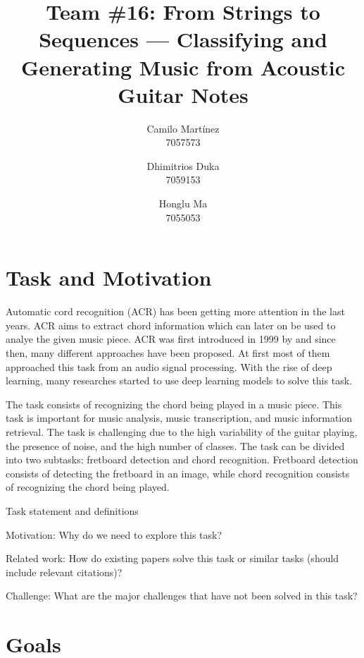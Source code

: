 \documentclass[10pt,twocolumn,letterpaper]{article}
\begin{document}
\title{Team \#16: From Strings to Sequences --- Classifying and Generating Music from Acoustic Guitar Notes}

\author{
Camilo Martínez\\
7057573\\
\and
Dhimitrios Duka\\
7059153\\
\and
Honglu Ma\\
7055053\\
}
\maketitle

\section{Task and Motivation}
Automatic cord recognition (ACR) has been getting more attention in the last years. ACR aims to extract chord information which can later on be used to analye the given music piece. ACR was first introduced in 1999 by \cite{} and since then, many different approaches have been proposed. At first most of them \cite{} approached this task from an audio signal processing. With the rise of deep learning, many researches started to use deep learning models to solve this task.  


The task consists of recognizing the chord being played in a music piece. This task is important for music analysis, music transcription, and music information retrieval. The task is challenging due to the high variability of the guitar playing, the presence of noise, and the high number of classes. The task can be divided into two subtasks: fretboard detection and chord recognition. Fretboard detection consists of detecting the fretboard in an image, while chord recognition consists of recognizing the chord being played.

Task statement and definitions

Motivation: Why do we need to explore this task?

Related work: How do existing papers solve this task or similar tasks (should include relevant citations)?

Challenge: What are the major challenges that have not been solved in this task?

\cite{Kristian_Zaman_Tenoyo_Jodhinata_2024}
\cite{du2023conditional}

\section{Goals}
\end{document}

